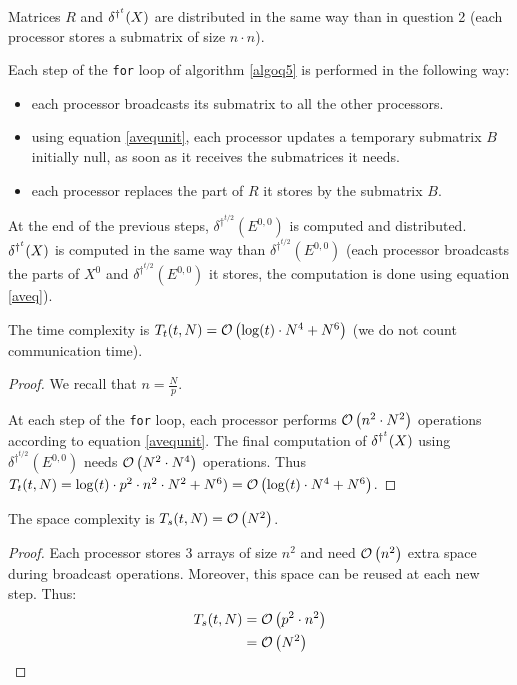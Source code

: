 Matrices $R$ and $\delta^{\dag^t}(X)$ are distributed in the same way than in question 2 (each processor stores a submatrix of size $n \cdot n$).

Each step of the \texttt{for} loop of algorithm \ref{algoq5} is performed in the following way:
\begin{itemize}
 \item each processor broadcasts its submatrix to all the other processors.
 \item using equation \ref{avequnit}, each processor updates a temporary submatrix $B$ initially null, as soon as it receives the submatrices it needs.
 \item each processor replaces the part of $R$ it stores by the submatrix $B$.
\end{itemize}

At the end of the previous steps, $\delta^{\dag^{t/2}}(E^{0,0})$ is computed and distributed. $\delta^{\dag^t}(X)$ is computed in the same way than $\delta^{\dag^{t/2}}(E^{0,0})$ (each processor broadcasts the parts of $X^0$ and $\delta^{\dag^{t/2}}(E^{0,0})$ it stores, the computation is done using equation \ref{aveq}).


\begin{prop}
 The time complexity is $T_t(t,N) = \mathcal O \left( \log(t) \cdot N^4 + N^6 \right)$ (we do not count communication time).
\end{prop}

\begin{proof}
 We recall that $n = \frac{N}{p}$.
 
  At each step of the \texttt{for} loop, each processor performs $\mathcal O \left( n^2 \cdot N^2 \right)$ operations according to equation \ref{avequnit}. The final computation of $\delta^{\dag^t}(X)$ using $\delta^{\dag^{t/2}}(E^{0,0})$ needs $\mathcal O \left( N^2 \cdot N^4 \right)$ operations. Thus $T_t(t,N) = \log(t) \cdot p^2 \cdot n^2 \cdot N^2 + N^6) = \mathcal O \left( \log(t) \cdot N^4 + N^6 \right)$.
\end{proof}

\begin{prop}
 The space complexity is $T_s(t,N) = \mathcal O \left( N^2 \right)$.
\end{prop}

\begin{proof}
 Each processor stores 3 arrays of size $n^2$ and need $\mathcal O \left( n^2 \right)$ extra space during broadcast operations. Moreover, this space can be reused at each new step. Thus:
  \[
    \begin{split}
        T_s(t,N) & = \mathcal O \left( p^2 \cdot n^2 \right)\\
                 & = \mathcal O \left( N^2 \right)
    \end{split}
 \] 
\end{proof}

